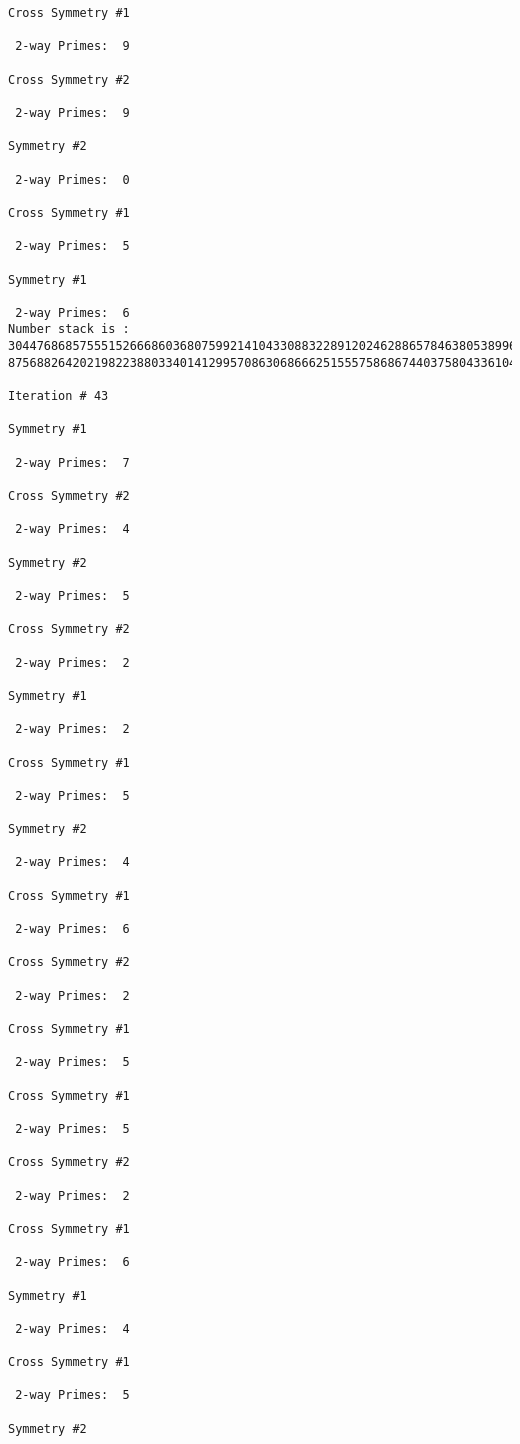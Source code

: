 \begin{verbatim}
Cross Symmetry #1

 2-way Primes: 	9

Cross Symmetry #2

 2-way Primes: 	9

Symmetry #2

 2-way Primes: 	0

Cross Symmetry #1

 2-way Primes: 	5

Symmetry #1

 2-way Primes: 	6
Number stack is :
30447686857555152666860368075992141043308832289120246288657846380538996794608835958544046240163340857
87568826420219822388033401412995708630686662515557586867440375804336104264044585953880649769983508364

Iteration #	43

Symmetry #1

 2-way Primes: 	7

Cross Symmetry #2

 2-way Primes: 	4

Symmetry #2

 2-way Primes: 	5

Cross Symmetry #2

 2-way Primes: 	2

Symmetry #1

 2-way Primes: 	2

Cross Symmetry #1

 2-way Primes: 	5

Symmetry #2

 2-way Primes: 	4

Cross Symmetry #1

 2-way Primes: 	6

Cross Symmetry #2

 2-way Primes: 	2

Cross Symmetry #1

 2-way Primes: 	5

Cross Symmetry #1

 2-way Primes: 	5

Cross Symmetry #2

 2-way Primes: 	2

Cross Symmetry #1

 2-way Primes: 	6

Symmetry #1

 2-way Primes: 	4

Cross Symmetry #1

 2-way Primes: 	5

Symmetry #2


\end{verbatim}
